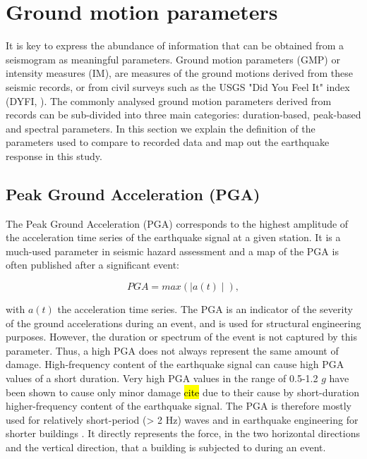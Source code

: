 \documentclass[../Text/00main.tex]{subfiles}
\begin{document}
\section{Ground motion parameters}

It is key to express the abundance of information that can be obtained from a seismogram as meaningful parameters. Ground motion parameters (GMP) or intensity measures (IM), are measures of the ground motions derived from these seismic records, or from civil surveys such as the USGS "Did You Feel It" index (DYFI, \cite{atkinson2007did}). The commonly analysed ground motion parameters derived from records can be sub-divided into three main categories: duration-based, peak-based and spectral parameters. In this section we explain the definition of the parameters used to compare to recorded data and map out the earthquake response in this study. 

\subsection{Peak Ground Acceleration (PGA)}

The Peak Ground Acceleration (PGA) corresponds to the highest amplitude of the acceleration time series of the earthquake signal at a given station. It is a much-used parameter in seismic hazard assessment and a map of the PGA is often published after a significant event:

\begin{equation}
    PGA = max(\mid a(t) \mid),
\end{equation}

with $a(t)$ the acceleration time series. The PGA is an indicator of the severity of the ground accelerations during an event, and is used for structural engineering purposes. However, the duration or spectrum of the event is not captured by this parameter. Thus, a high PGA does not always represent the same amount of damage. High-frequency content of the earthquake signal can cause high PGA values of a short duration. Very high PGA values in the range of 0.5-1.2 $g$ have been shown to cause only minor damage \hl{cite} due to their cause by short-duration higher-frequency content of the earthquake signal. The PGA is therefore mostly used for relatively short-period (> 2 Hz) waves and in earthquake engineering for shorter buildings \citep{kramer:1996}. It directly represents the force, in the two horizontal directions and the vertical direction, that a building is subjected to during an event. 
\end{document}
